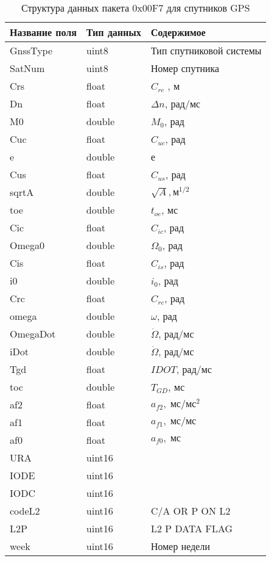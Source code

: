 \begin{longtable}[c]{|lll|}
	\caption{Структура данных пакета 0x00F7 для спутников GPS} \label{tab:formatf7gps}\\
	\hline
	Название поля & Тип данных & Содержимое \\
	\hline
	GnssType & uint8 & Тип спутниковой системы \\
	SatNum & uint8 & Номер спутника \\
	Crs & float & $C_{rc}$ , м \\
	Dn & float & $\Delta n$, рад/мс \\
	M0 & double &  $M_0$, рад \\
	Cuc & float & $C_{uc}$, рад\\
	e & double & е \\
	Cus & float & $C_{us}$, рад \\
	sqrtA & double & $\sqrt{A}, м^{1/2}$ \\
	toe & double & $t_{oe}$, мс \\
	Cic & float & $C_{ic}$, рад \\
	Omega0 & double & $\Omega_{0}$, рад \\
	Cis & float & $C_{is}$, рад \\
	i0 & double & $i_{0}$, рад \\
	Crc & float & $C_{rc}$, рад \\
	omega & double & $\omega$, рад \\
	OmegaDot & double & $\dot{\Omega}$, рад/мс \\
	iDot & double & $\dot{\Omega}$, рад/мс \\
	Tgd & float & $IDOT$, рад/мс \\
	toc & double & $T_{GD}$, мс \\
	af2 & float & $a_{f2},\;мс/мс^2$ \\
	af1 & float & $a_{f1},\;мс/мс$ \\
	af0 & float & $a_{f0},\;мс$ \\
	URA & uint16 &  \\
	IODE & uint16 &  \\
	IODC & uint16 &  \\
	codeL2 & uint16 & C/A OR P ON L2 \\
	L2P & uint16 & L2 P DATA FLAG \\
	week & uint16 & Номер недели \\
	\hline	
\end{longtable}
\newpage
